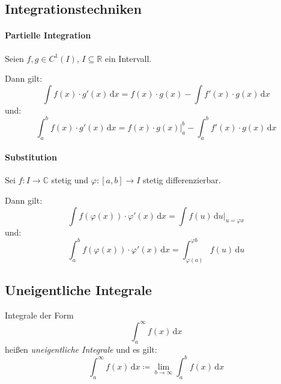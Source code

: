\documentclass[a4paper, 11pt, accentcolor = tud3b]{tudreport}
\begin{document}
            \subsection{Integrationstechniken}
                \paragraph{Partielle Integration}
                    Seien $ f, g \in C ^ 1 (I) $, $ I \subseteq \mathbb{R} $ ein Intervall.

                    Dann gilt:
                    \begin{equation*}
                        \int \! f(x) \cdot g'(x) \, \mathrm{d}x = f(x) \cdot g(x) - \int \! f'(x) \cdot g(x) \, \mathrm{d}x
                    \end{equation*}
                    und:
                    \begin{equation*}
                        \int _ a ^ b \! f(x) \cdot g'(x) \, \mathrm{d}x = f(x) \cdot g(x) \Bigr| _ a ^ b - \int _ a ^ b \! f'(x) \cdot g(x) \, \mathrm{d}x
                    \end{equation*}

                \paragraph{Substitution}
                    Sei $ f : I \rightarrow \mathbb{C} $ stetig und $ \varphi : [a, b] \rightarrow I $ stetig differenzierbar.

                    Dann gilt:
                    \begin{equation*}
                        \int \! f(\varphi(x)) \cdot \varphi'(x) \, \mathrm{d}x = \int \! f(u) \, \mathrm{d}u \Bigr| _ { u = \varphi{x} }
                    \end{equation*}
                    und:
                    \begin{equation*}
                        \int _ a ^ b \! f(\varphi(x)) \cdot \varphi'(x) \, \mathrm{d}x = \int _ { \varphi(a) } ^ { \varphi{b} } \! f(u) \, \mathrm{d}u
                    \end{equation*}

            \subsection{Uneigentliche Integrale}
                Integrale der Form \[ \int _ a ^ \infty \! f(x) \, \mathrm{d}x \] heißen \textit{uneigentliche Integrale} und es gilt:
                \begin{equation*}
                    \int _ a ^ \infty \! f(x) \, \mathrm{d}x \coloneqq \lim _ { b \rightarrow \infty } \int _ a ^ b \! f(x) \, \mathrm{d}x
                \end{equation*}
\end{document}
